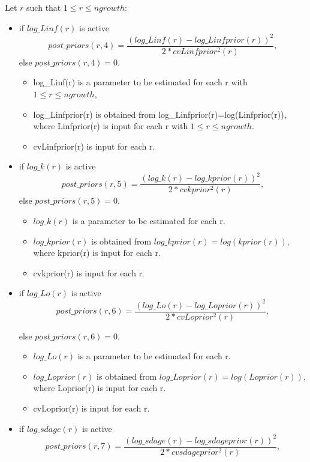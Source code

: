 \documentclass{article}
\begin{document}
    Let $r$ such that $1\leq r \leq ngrowth$:
    \begin{itemize}
        \item if $log\_Linf(r)$ is active
        \begin{equation}
            post\_priors(r,4) = \dfrac{(log\_Linf(r)-log\_Linfprior(r))^2}{2*cvLinfprior^2(r)},
        \end{equation}
        else $post\_priors(r,4)=0.$
        \begin{itemize}
            \item log\_Linf(r) is a parameter to be estimated for each r with $1\leq r \leq ngrowth$,
            \item log\_Linfprior(r) is obtained from log\_Linfprior(r)=log(Linfprior(r)), where Linfprior(r) is input for each r with $1\leq r\leq ngrowth$.
            \item cvLinfprior(r) is input for each r.
        \end{itemize}
        \item if $log\_k(r)$ is active
        \begin{equation}
            post\_priors(r,5) = \dfrac{(log\_k(r)-log\_kprior(r))^2}{2*cvkprior^2(r)},
        \end{equation}
        else  $post\_priors(r,5)=0$.
        \begin{itemize}
            \item $log\_k(r)$ is a parameter to be estimated for each r.
            \item $log\_kprior(r)$ is obtained from $log\_kprior(r)=log(kprior(r))$, where kprior(r) is input for each r.
            \item cvkprior(r) is input for each r.
        \end{itemize}
        \item if $log\_Lo(r)$ is active
        \begin{equation}
            post\_priors(r,6) = \dfrac{(log\_Lo(r)-log\_Loprior(r))^2}{2*cvLoprior^2(r)},
        \end{equation}

        else $post\_priors(r,6)=0$.
        \begin{itemize}
            \item $log\_Lo(r)$ is a parameter to be estimated for each r.
            \item $log\_Loprior(r)$ is obtained from $log\_Loprior(r)=log(Loprior(r))$, where Loprior(r) is input for each r.
            \item cvLoprior(r) is input for each r.
        \end{itemize}
        \item if $log\_sdage(r)$ is active
        \begin{equation}
            post\_priors(r,7) = \dfrac{(log\_sdage(r)-log\_sdageprior(r))^2}{2*cvsdageprior^2(r)},
        \end{equation}


\end{itemize}
\end{document}
